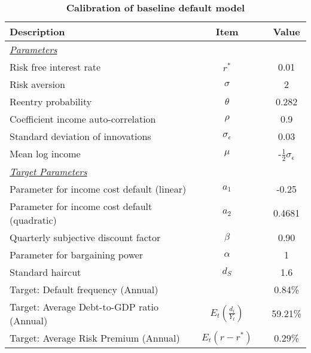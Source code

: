 \begin{table}[h]
\setlength{\arrayrulewidth}{0.3mm}
\centering
    \caption{\textbf{Calibration of baseline default model}}
    \label{tab:Calibration}
    \vspace{1mm}
 \begin{tabular}{lccc} 
\hline\hline
\textbf {Description}                          &  \textbf {Item}       &&  \textbf {Value}                  \\[1ex] 
\hline\hline
\textit{\underline{Parameters}}                &                       &&                                  \\[1ex]
Risk free interest rate                         & $r^*$                 && 0.01                             \\[1ex]
Risk aversion                                   & $\sigma$              && 2                                \\[1ex] 
Reentry probability                             & $\theta$              && 0.282                            \\[1ex] 
Coefficient income auto-correlation              & $\rho$                && 0.9                              \\[1ex] 
Standard deviation of innovations               & $\sigma_\epsilon$     && 0.03                             \\[1ex] 
Mean log income                                 & $\mu$                 && -$\frac{1}{ 2}\sigma_\epsilon$   \\[1ex] 
\textit{\underline{Target Parameters}}          &                       &&                               \\[1ex] 
Parameter for income cost default (linear)      & $a_1$                 &&-0.25                             \\[1ex] 
Parameter for income cost default (quadratic)   & $a_2$                 && 0.4681
\\[1ex] 
Quarterly subjective discount factor            & $\beta$               && 0.90                             \\[1ex] 
Parameter for bargaining power                  & $\alpha$              && 1                             \\[1ex]
Standard haircut                                & $d_S$                 && 1.6                             \\[1ex]
\hline\hline
Target: Default frequency (Annual)              &                       && 0.84\%                           \\[1ex] 
Target: Average Debt-to-GDP ratio (Annual)      &$E_t(\frac{d_t}{Y_t})$ && 59.21\%                             \\[1ex]
Target: Average Risk Premium (Annual)           & $E_t(r-r^*)$          && 0.29\%                          \\[1ex]
\hline\hline
\end{tabular}
\end{table}
